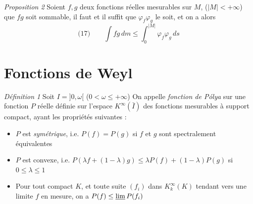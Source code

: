 \documentclass[11pt,a4paper]{article}
\begin{document}
\emph{Proposition 2} Soient $f, g$ deux fonctions réelles mesurables sur $M$,  ($|M| < +\infty$)    que $fg$ soit sommable, il faut et il suffit que $\varphi_f\varphi_g$ le soit, et on a alors
\[
  \text{(17)}\qquad \int fg\, dm \leq \int_0^{|M|} \varphi_f\varphi_g\, ds
\]

\section{Fonctions de Weyl}



\emph{Définition 1} Soit  $I = ]0, \omega[$ ($0 < \omega \leq +\infty$)  On appelle \emph{fonction de Pólya} sur   une fonction $P$ réelle définie sur l'espace $K^\infty(\bar{I})$ des fonctions mesurables à support compact, ayant les propriétés suivantes :
\begin{itemize}
  \item[$P_1$)] $P$ est \emph{symétrique}, i.e. $P(f) = P(g)$ si $f$ et $g$ sont spectralement équivalentes
  \item[$P_2$)] $P$ est convexe, i.e. $P(\lambda f + (1-\lambda) g) \leq \lambda P(f) + (1-\lambda) P(g)$ si $0 \leq \lambda \leq 1$
  \item[$P_3$)] Pour tout compact $K$,  et toute suite $(f_i)$ dans $K^{\infty}_{k}(K)$  tendant vers une limite $f$ en mesure, on a $P(f) \leq \varliminf P(f_i)$
\end{itemize}
\end{document}
